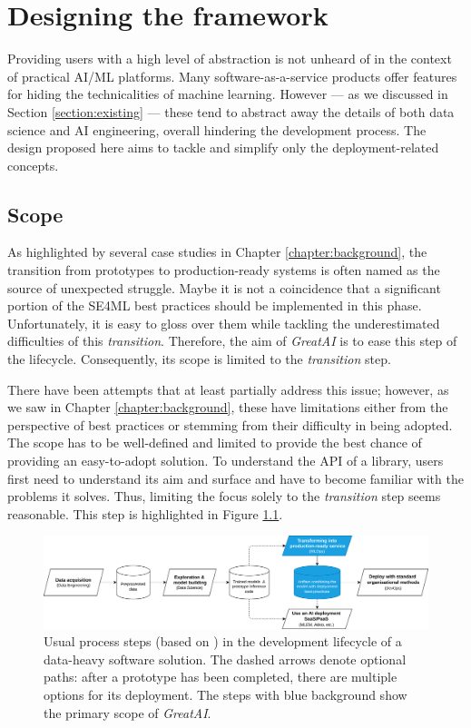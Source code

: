 \chapter{Designing the framework} \label{chapter:design}

Providing users with a high level of abstraction is not unheard of in the context of practical AI/ML platforms. Many software-as-a-service products offer features for hiding the technicalities of machine learning. However --- as we discussed in Section \ref{section:existing} --- these tend to abstract away the details of both data science and AI engineering, overall hindering the development process. The design proposed here aims to tackle and simplify only the deployment-related concepts.

\section{Scope} \label{section:scope}

As highlighted by several case studies in Chapter \ref{chapter:background}, the transition from prototypes to production-ready systems is often named as the source of unexpected struggle. Maybe it is not a coincidence that a significant portion of the SE4ML best practices should be implemented in this phase. Unfortunately, it is easy to gloss over them while tackling the underestimated difficulties of this \textit{transition}. Therefore, the aim of \textit{GreatAI} is to ease this step of the lifecycle. Consequently, its scope is limited to the \textit{transition} step.

There have been attempts that at least partially address this issue; however, as we saw in Chapter \ref{chapter:background}, these have limitations either from the perspective of best practices or stemming from their difficulty in being adopted. The scope has to be well-defined and limited to provide the best chance of providing an easy-to-adopt solution. To understand the API of a library, users first need to understand its aim and surface and have to become familiar with the problems it solves. Thus, limiting the focus solely to the \textit{transition} step seems reasonable. This step is highlighted in Figure \ref{fig:scope}.

\begin{figure}
    \centering
    \includegraphics[width=\linewidth]{figures/scope.drawio.png}
    \captionsetup{width=.9\linewidth}
    \caption{Usual process steps (based on \cite{john2020architecting}) in the development lifecycle of a data-heavy software solution. The dashed arrows denote optional paths: after a prototype has been completed, there are multiple options for its deployment. The steps with blue background show the primary scope of \textit{GreatAI}.}
    \label{fig:scope}
\end{figure}

